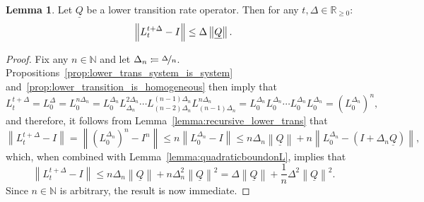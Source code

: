 \documentclass[10pt,a4paper]{paper}
\theoremstyle{definition}
\newtheorem{lemma}[theorem]{Lemma}
\newcommand{\nats}{\mathbb{N}}
\newcommand{\reals}{\mathbb{R}}
\newcommand{\realsnonneg}{\reals_{\geq 0}}
\newcommand{\lrate}{\underline{Q}}
\newcommand{\norm}[1]{\left\lVert #1 \right\rVert}
\newcommand{\coloneqq}{:\!=}
\begin{document}
\begin{lemma}\label{lemma:linearboundonL}
Let $\lrate$ be a lower transition rate operator. Then for any $t,\Delta\in\realsnonneg$:
\begin{equation*}
\norm{L_t^{t+\Delta}-I}\leq\Delta\norm{\lrate}.\vspace{5pt}
\end{equation*}
\end{lemma}
\begin{proof}
Fix any $n\in\nats$ and let $\Delta_n\coloneqq\nicefrac{\Delta}{n}$. Propositions~\ref{prop:lower_trans_system_is_system} and~\ref{prop:lower_transition_is_homogeneous} then imply that
\begin{equation*}
L_t^{t+\Delta}
=L_0^{\Delta}
=L_0^{n\Delta_n}
=L_0^{\Delta_n}
L_{\Delta_n}^{2\Delta_n}
\cdots
L_{(n-2)\Delta_n}^{(n-1)\Delta_n}
L_{(n-1)\Delta_n}^{n\Delta_n}
=L_0^{\Delta_n}
L_0^{\Delta_n}
\cdots
L_0^{\Delta_n}
L_0^{\Delta_n}
=(L_0^{\Delta_n})^n,
\end{equation*}
and therefore, it follows from Lemma~\ref{lemma:recursive_lower_trans} that
\begin{equation*}
\norm{L_t^{t+\Delta}-I}
=
\norm{(L_0^{\Delta_n})^n-I^n}
\leq n\norm{L_0^{\Delta_n}-I}
\leq n\Delta_n\norm{\lrate}+n\norm{L_0^{\Delta_n}-(I+\Delta_n\lrate)},
\end{equation*}
which, when combined with Lemma~\ref{lemma:quadraticboundonL}, implies that
\begin{equation*}
\norm{L_t^{t+\Delta}-I}
\leq
n\Delta_n\norm{\lrate}+n\Delta_n^2\norm{\lrate}^2
=\Delta\norm{\lrate}+\frac{1}{n}\Delta^2\norm{\lrate}^2.
\end{equation*}
Since $n\in\nats$ is arbitrary, the result is now immediate.
\end{proof}
\end{document}
